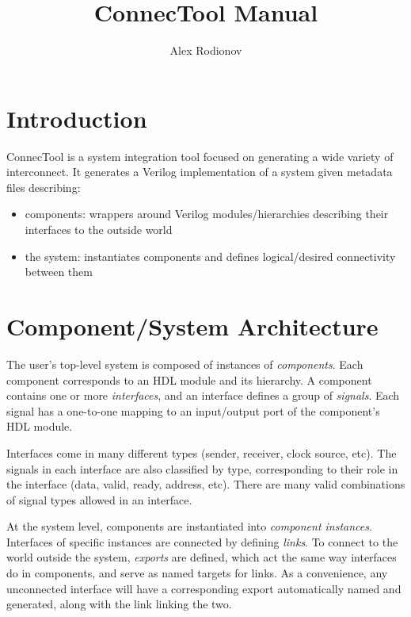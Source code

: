 \documentclass{article}
\begin{document}
\title{ConnecTool Manual}
\author{Alex Rodionov}
\maketitle

\section{Introduction}

ConnecTool is a system integration tool focused on generating a wide variety of interconnect. It generates a Verilog implementation of a system given metadata files describing:

\begin{itemize}
\item{components: wrappers around Verilog modules/hierarchies describing their interfaces to the outside world}
\item{the system: instantiates components and defines logical/desired connectivity between them}
\end{itemize}

\section{Component/System Architecture}

The user's top-level system is composed of instances of \textit{components}. Each component corresponds to an HDL module and its hierarchy. A component contains one or more \textit{interfaces}, and an interface defines a group of \textit{signals}. Each signal has a one-to-one mapping to an input/output port of the component's HDL module.

Interfaces come in many different types (sender, receiver, clock source, etc). The signals in each interface are also classified by type, corresponding to their role in the interface (data, valid, ready, address, etc). There are many valid combinations of signal types allowed in an interface.

At the system level, components are instantiated into \textit{component instances}. Interfaces of specific instances are connected by defining \textit{links}. To connect to the world outside the system, \textit{exports} are defined, which act the same way interfaces do in components, and serve as named targets for links. As a convenience, any unconnected interface will have a corresponding export automatically named and generated, along with the link linking the two.
\end{document}
